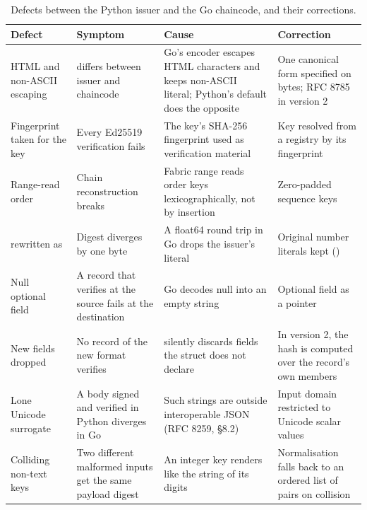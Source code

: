 \begin{table}[t]
\caption{Defects between the Python issuer and the Go chaincode, and their corrections.}
\label{tab:defects}
\footnotesize
\begin{tabularx}{\textwidth}{@{}>{\raggedright\arraybackslash}p{}>{\raggedright\arraybackslash}p{}LL@{}}
\toprule
Defect & Symptom & Cause & Correction \\
\midrule
HTML and non-ASCII escaping &  differs between issuer and chaincode & Go's encoder escapes HTML characters and keeps non-ASCII literal; Python's default does the opposite & One canonical form specified on bytes; RFC 8785 in version 2 \\
Fingerprint taken for the key & Every Ed25519 verification fails & The key's SHA-256 fingerprint used as verification material & Key resolved from a registry by its fingerprint \\
Range-read order & Chain reconstruction breaks & Fabric range reads order keys lexicographically, not by insertion & Zero-padded sequence keys \\
 rewritten as  & Digest diverges by one byte & A float64 round trip in Go drops the issuer's literal & Original number literals kept () \\
Null optional field & A record that verifies at the source fails at the destination & Go decodes null into an empty string & Optional field as a pointer \\
New fields dropped & No record of the new format verifies &  silently discards fields the struct does not declare & In version 2, the hash is computed over the record's own members \\
Lone Unicode surrogate & A body signed and verified in Python diverges in Go & Such strings are outside interoperable JSON (RFC 8259, \S8.2) & Input domain restricted to Unicode scalar values \\
Colliding non-text keys & Two different malformed inputs get the same payload digest & An integer key renders like the string of its digits & Normalisation falls back to an ordered list of pairs on collision \\
\bottomrule
\end{tabularx}
\end{table}
